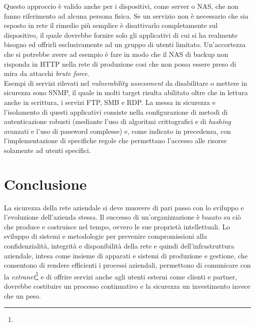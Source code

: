 \documentclass[target=bach,aauheader=]{thud}
\begin{document}
Questo approccio è valido anche per i dispositivi, come server o NAS, che non fanno riferimento ad alcuna persona fisica. Se un servizio non è necessario che sia esposto in rete il rimedio più semplice è disattivarlo completamente sul dispositivo, il quale dovrebbe fornire solo gli applicativi di cui si ha realmente bisogno ed offrirli esclusivamente ad un gruppo di utenti limitato. Un'accortezza che si potrebbe avere ad esempio è fare in modo che il NAS di backup non risponda in HTTP nella rete di produzione cosi che non possa essere preso di mira da attacchi \textit{brute force}.
\\Esempi di servizi rilevati nel \textit{vulnerability assessment} da disabilitare o mettere in sicurezza sono SNMP, il quale in molti target risulta abilitato oltre che in lettura anche in scrittura, i servizi FTP, SMB e RDP. La messa in sicurezza e l'isolamento di questi applicativi consiste nella configurazione di metodi di autenticazione robusti (mediante l'uso di algoritmi crittografici e di \textit{hashing} avanzati e l'uso di password complesse) e, come indicato in precedenza, con l'implementazione di specifiche regole che permettano l'accesso alle risorse solamente ad utenti specifici.


\chapter{Conclusione}

La sicurezza della rete aziendale si deve muovere di pari passo con lo sviluppo e l'evoluzione dell'azienda stessa. Il successo di un'organizzazione è basato su ciò che produce e costruisce nel tempo, ovvero le sue proprietà intellettuali. Lo sviluppo di sistemi e metodologie per prevenire compromissioni alla confidenzialità, integrità e disponibilità della rete e quindi dell'infrastruttura aziendale, intesa come insieme di apparati e sistemi di produzione e gestione, che consentono di rendere efficienti i processi aziendali, permettono di comunicare con la \textit{extranet}\footnote{} e di offrire servizi anche agli utenti esterni come clienti e partner, dovrebbe costituire un processo continuativo e la sicurezza un investimento invece che un peso.
\end{document}
